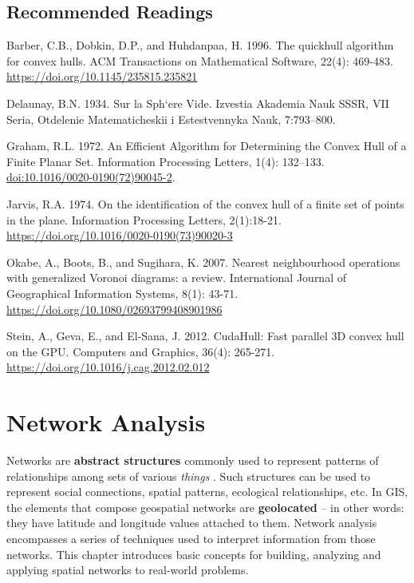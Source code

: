 \documentclass[
]{book}
\begin{document}
\hypertarget{recommended-readings-2}{%
\section*{Recommended Readings}\label{recommended-readings-2}}

Barber, C.B., Dobkin, D.P., and Huhdanpaa, H. 1996. The quickhull algorithm for convex hulls. ACM Transactions on Mathematical Software, 22(4): 469-483. \url{https://doi.org/10.1145/235815.235821}

Delaunay, B.N. 1934. Sur la Sph`ere Vide. Izvestia Akademia Nauk SSSR, VII Seria, Otdelenie
Matematicheskii i Estestvennyka Nauk, 7:793--800.

Graham, R.L. 1972. An Efficient Algorithm for Determining the Convex Hull of a Finite Planar Set. Information Processing Letters, 1(4): 132--133. \url{doi:10.1016/0020-0190(72)90045-2}.

Jarvis, R.A. 1974. On the identification of the convex hull of a finite set of points in the plane. Information Processing Letters, 2(1):18-21. \url{https://doi.org/10.1016/0020-0190(73)90020-3}

Okabe, A., Boots, B., and Sugihara, K. 2007. Nearest neighbourhood operations with generalized Voronoi diagrams: a review. International Journal of Geographical Information Systems, 8(1): 43-71. \url{https://doi.org/10.1080/02693799408901986}

Stein, A., Geva, E., and El-Sana, J. 2012. CudaHull: Fast parallel 3D convex hull on the GPU. Computers and Graphics, 36(4): 265-271. \url{https://doi.org/10.1016/j.cag.2012.02.012}

\hypertarget{network-analysis}{%
\chapter{Network Analysis}\label{network-analysis}}

Networks are \textbf{abstract structures} commonly used to represent patterns of relationships among sets of various \emph{things} \citep{ajorlou_introduction_2018}. Such structures can be used to represent social connections, spatial patterns, ecological relationships, etc. In GIS, the elements that compose geospatial networks are \textbf{geolocated} -- in other words: they have latitude and longitude values attached to them. Network analysis encompasses a series of techniques used to interpret information from those networks. This chapter introduces basic concepts for building, analyzing and applying spatial networks to real-world problems.
\end{document}
